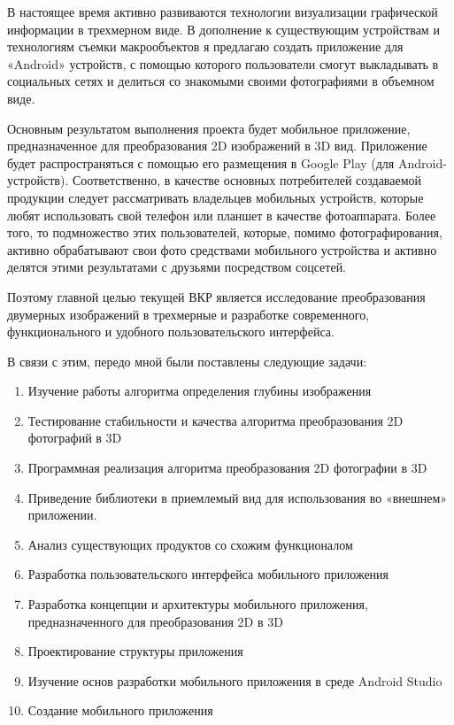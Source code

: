 В настоящее  время активно развиваются технологии визуализации графической информации в трехмерном виде. В дополнение к существующим устройствам и технологиям съемки макрообъектов я предлагаю создать приложение для «Android» устройств, с помощью которого пользователи смогут выкладывать в социальных сетях и делиться со знакомыми своими фотографиями в объемном виде.

Основным результатом выполнения проекта будет мобильное приложение, предназначенное для преобразования 2D изображений в 3D вид. Приложение будет распространяться с помощью его размещения в Google Play (для Android-устройств). Соответственно, в качестве основных потребителей создаваемой продукции следует рассматривать владельцев мобильных устройств, которые любят использовать свой телефон или планшет в качестве фотоаппарата. Более того, то подмножество этих пользователей, которые, помимо фотографирования, активно обрабатывают свои фото средствами мобильного устройства и активно делятся этими результатами с друзьями посредством соцсетей.

Поэтому главной целью текущей ВКР является исследование	преобразования двумерных изображений в трехмерные и разработке современного, функционального и удобного пользовательского интерфейса. 

В связи с этим, передо мной были поставлены следующие задачи:

\begin{enumerate}
	\item Изучение работы алгоритма определения глубины изображения
	\item Тестирование стабильности и качества алгоритма преобразования 2D фотографий в 3D
	\item Программная реализация алгоритма преобразования 2D фотографии в 3D
	\item Приведение библиотеки в приемлемый вид для использования во «внешнем» приложении.
	\item Анализ существующих продуктов со схожим функционалом
	\item Разработка пользовательского интерфейса мобильного приложения
	\item Разработка концепции и архитектуры мобильного приложения, предназначенного для преобразования 2D в 3D
	\item Проектирование структуры приложения
	\item Изучение основ разработки мобильного приложения в среде Android Studio
	\item Создание мобильного приложения

\end{enumerate}